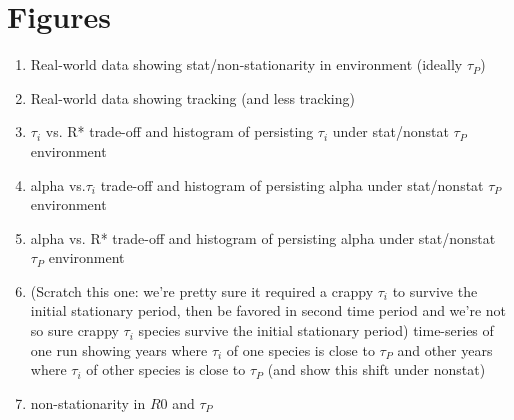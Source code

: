 \documentclass[11pt,letterpaper]{article}
\begin{document}
\section{Figures}
\begin{enumerate}
\item Real-world data showing stat/non-stationarity in environment (ideally $\tau_{P}$) 
\item Real-world data showing tracking (and less tracking)
\item $\tau_{i}$ vs. R* trade-off and histogram of persisting $\tau_i$ under stat/nonstat $\tau_{P}$ environment
\item alpha vs.$\tau_i$ trade-off and histogram of persisting alpha under stat/nonstat $\tau_{P}$ environment
\item alpha vs. R* trade-off and histogram of persisting alpha under stat/nonstat $\tau_{P}$ environment
\item (Scratch this one: we're pretty sure it required a crappy $\tau_i$ to survive the initial stationary period, then be favored in second time period and we're not so sure crappy $\tau_i$ species survive the initial stationary period) time-series of one run showing years where $\tau_i$ of one species is close to $\tau_{P}$ and other years where $\tau_i$ of other species is close to $\tau_{P}$ (and show this shift under nonstat)
\item non-stationarity in $R0$ and $\tau_{P}$
\end{enumerate}








\newpage


\end{document}
